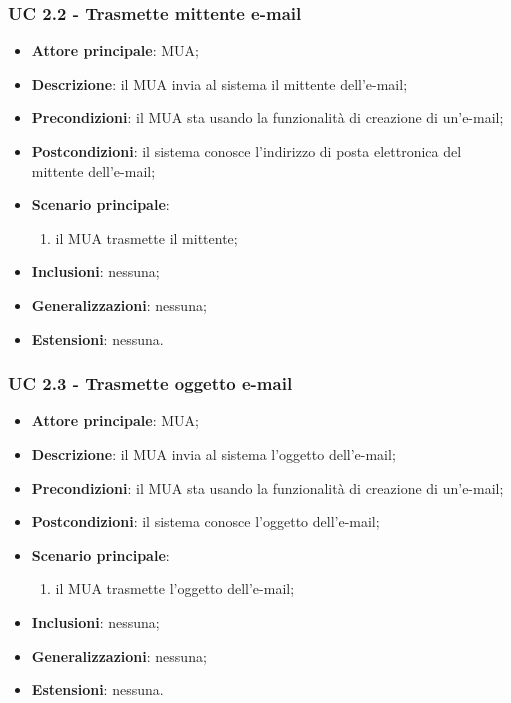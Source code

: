     \subsubsection{UC 2.2 - Trasmette mittente e-mail} \label{sec:UC2.2}
    \begin{itemize}
        \item \textbf{Attore principale}: MUA;
        \item \textbf{Descrizione}: il MUA invia al sistema il mittente dell'e-mail;
        \item \textbf{Precondizioni}: il MUA sta usando la funzionalità di creazione di un'e-mail;
        \item \textbf{Postcondizioni}: il sistema conosce l'indirizzo di posta elettronica del mittente dell'e-mail;
        \item \textbf{Scenario principale}:
            \begin{enumerate}
                \item il MUA trasmette il mittente;
            \end{enumerate}
        \item \textbf{Inclusioni}: nessuna;
        \item \textbf{Generalizzazioni}: nessuna;
        \item \textbf{Estensioni}: nessuna.
    \end{itemize}

    \subsubsection{UC 2.3 - Trasmette oggetto e-mail} \label{sec:UC2.3}
    \begin{itemize}
        \item \textbf{Attore principale}: MUA;
        \item \textbf{Descrizione}: il MUA invia al sistema l'oggetto dell'e-mail;
        \item \textbf{Precondizioni}: il MUA sta usando la funzionalità di creazione di un'e-mail;
        \item \textbf{Postcondizioni}: il sistema conosce l'oggetto dell'e-mail;
        \item \textbf{Scenario principale}:
            \begin{enumerate}
                \item il MUA trasmette l'oggetto dell'e-mail;
            \end{enumerate}
        \item \textbf{Inclusioni}: nessuna;
        \item \textbf{Generalizzazioni}: nessuna;
        \item \textbf{Estensioni}: nessuna.
    \end{itemize}

